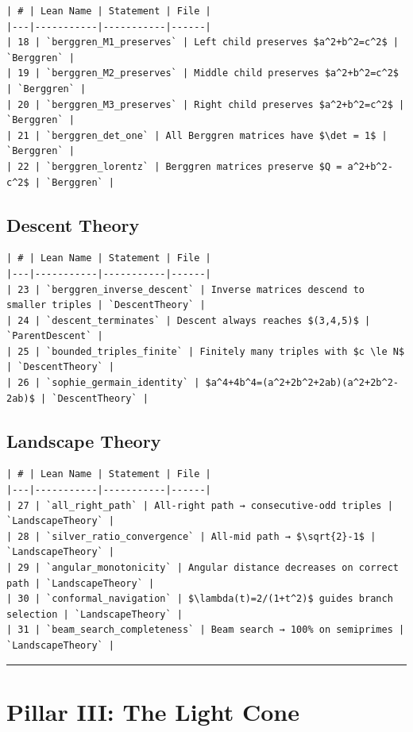 \documentclass[12pt,a4paper,openany]{book}
\begin{document}
\begin{verbatim}
| # | Lean Name | Statement | File |
|---|-----------|-----------|------|
| 18 | `berggren_M1_preserves` | Left child preserves $a^2+b^2=c^2$ | `Berggren` |
| 19 | `berggren_M2_preserves` | Middle child preserves $a^2+b^2=c^2$ | `Berggren` |
| 20 | `berggren_M3_preserves` | Right child preserves $a^2+b^2=c^2$ | `Berggren` |
| 21 | `berggren_det_one` | All Berggren matrices have $\det = 1$ | `Berggren` |
| 22 | `berggren_lorentz` | Berggren matrices preserve $Q = a^2+b^2-c^2$ | `Berggren` |
\end{verbatim}

\subsection{Descent Theory}

\begin{verbatim}
| # | Lean Name | Statement | File |
|---|-----------|-----------|------|
| 23 | `berggren_inverse_descent` | Inverse matrices descend to smaller triples | `DescentTheory` |
| 24 | `descent_terminates` | Descent always reaches $(3,4,5)$ | `ParentDescent` |
| 25 | `bounded_triples_finite` | Finitely many triples with $c \le N$ | `DescentTheory` |
| 26 | `sophie_germain_identity` | $a^4+4b^4=(a^2+2b^2+2ab)(a^2+2b^2-2ab)$ | `DescentTheory` |
\end{verbatim}

\subsection{Landscape Theory}

\begin{verbatim}
| # | Lean Name | Statement | File |
|---|-----------|-----------|------|
| 27 | `all_right_path` | All-right path → consecutive-odd triples | `LandscapeTheory` |
| 28 | `silver_ratio_convergence` | All-mid path → $\sqrt{2}-1$ | `LandscapeTheory` |
| 29 | `angular_monotonicity` | Angular distance decreases on correct path | `LandscapeTheory` |
| 30 | `conformal_navigation` | $\lambda(t)=2/(1+t^2)$ guides branch selection | `LandscapeTheory` |
| 31 | `beam_search_completeness` | Beam search → 100% on semiprimes | `LandscapeTheory` |
\end{verbatim}

\bigskip\hrule\bigskip

\section{Pillar III: The Light Cone}
\end{document}
